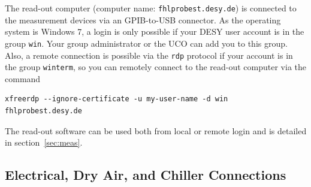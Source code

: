 \documentclass[a4paper]{article}
\begin{document}
The read-out computer (computer name: {\tt fhlprobest.desy.de}) is connected to the measurement devices via an GPIB-to-USB connector.
As the operating system is Windows 7, a login is only possible if your DESY user account is in the group {\tt win}.
Your group administrator or the UCO can add you to this group.
Also, a remote connection is possible via the {\tt rdp} protocol if your account is in the group {\tt winterm}, so you can remotely connect to the read-out computer via the command

\medskip
\begin{lstlisting}
xfreerdp --ignore-certificate -u my-user-name -d win fhlprobest.desy.de
\end{lstlisting}
\medskip

The read-out software can be used both from local or remote login and is detailed in section~\ref{sec:meas}.\\

\subsection{Electrical, Dry Air, and Chiller Connections}
\label{sec:connections}
\end{document}
